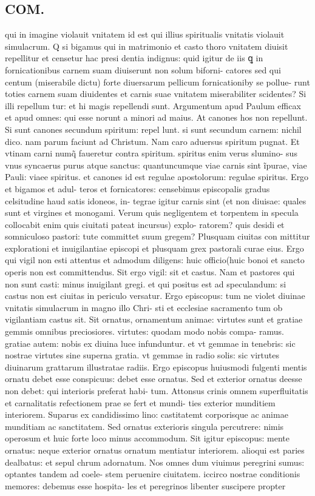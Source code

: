 \documentclass{article}
\begin{document}
\begin{pages}
\section*{COM. }
\marginpar{[ p.3 ]}\pstart qui in imagine violauit vnitatem id est qui illius spiritualis vnitatis violauit simulacrum. Q si bigamus qui in matrimonio et casto thoro vnitatem diuisit repellitur et censetur hac presi dentia indignus: quid igitur de iis ꝗ in fornicationibus carnem suam diuiserunt non solum biforni- catores sed qui centum (miserabile dictu) forte diuersarum pellicum fornicationiby se pollue- runt toties carnem suam diuidentes et carnis suae vnitatem miserabiliter scidentes? Si illi repellum tur: et hi magis repellendi sunt. Argumentum apud Paulum efficax et apud omnes: qui esse norunt a minori ad maius. At canones hos non repellunt. Si sunt canones secundum spiritum: repel lunt. si sunt secundum carnem: nichil dico. nam parum faciunt ad Christum. Nam caro aduersus spiritum pugnat. Et vtinam carni numq̃ faueretur contra spiritum. spiritus enim verus slumino- sus vnus syncaerus purus atque sanctus: quantuncumque viae carnis sint ĩpurae, viae Pauli: viaee spiritus. et canones id est regulae apostolorum: regulae spiritus. Ergo et bigamos et adul- teros et fornicatores: censebimus episcopalis gradus celsitudine haud satis idoneos, in- tegrae igitur carnis sint (et non diuisae: quales sunt et virgines et monogami. Verum quis negligentem et torpentem in specula collocabit enim quis ciuitati pateat incursus) explo- ratorem? quis desidi et somniculoso pastori: tute committet suum gregem? Plusquam ciuitas con mittitur explorationi et inuigilantiae episcopi et plusquam grex pastorali curae eius. Ergo qui vigil non esti attentus et admodum diligens: huic officio(huic bonoi et sancto operis non est committendus. Sit ergo vigil: sit et castus. Nam et pastores qui non sunt casti: minus inuigilant gregi. et qui positus est ad speculandum: si castus non est ciuitas in periculo versatur. Ergo episcopus: tum ne violet diuinae vnitatis simulacrum in magno illo Chri- sti et ecclesiae sacramento tum ob vigilantiam castus sit. Sit ornatus, ornamentum animae: virtutes sunt et gratiae gemmis omnibus preciosiores. virtutes: quodam modo nobis compa- ramus. gratiae autem: nobis ex diuina luce infunduntur. et vt gemmae in tenebris: sic nostrae virtutes sine superna gratia. vt gemmae in radio solis: sic virtutes diuinarum grattarum illustratae radiis. Ergo episcopus huiusmodi fulgenti mentis ornatu debet esse conspicuus: debet esse ornatus. Sed et exterior ornatus deesse non debet: qui interioris preferat habi- tum. Attonsus crinis omnem superfluitatis et carnalitatis refectionem prae se fert et mundi- ties exterior munditiem interiorem. Suparus ex candidissimo lino: castitatemt corporisque  ac animae munditiam ac sanctitatem. Sed ornatus exterioris singula percutrere: nimis operosum et huic forte loco minus accommodum. Sit igitur episcopus: mente ornatus: neque exterior ornatus ornatum mentiatur interiorem. alioqui est paries dealbatus: et sepul chrum adornatum. Nos omnes dum viuimus peregrini sumus: optantes tandem ad coele- stem peruenire ciuitatem. iccirco nostrae conditionis memores: debemus esse hospita- les et peregrinos libenter suscipere propter 
\end{pages}
\end{document}
